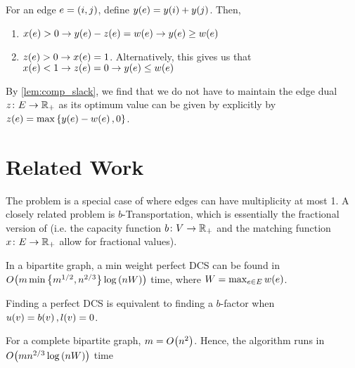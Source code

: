 
\begin{lemma}
    For an edge $e = \lrp{i, j}$, define $\f[y]{e} = \f[y]{i} + \f[y]{j}$. Then, 
    \begin{enumerate}
        \item $\f[x]{e} > 0 \rightarrow \f[y]{e} - \f[z]{e} = \f[w]{e} \rightarrow \f[y]{e} \geq \f[w]{e}$
        \item $\f[z]{e} > 0 \rightarrow \f[x]{e} = 1$. Alternatively, this gives us that $\f[x]{e} < 1 \rightarrow \f[z]{e} = 0 \rightarrow \f[y]{e} \leq \f[w]{e}$
    \end{enumerate} 
    \label{lem:comp_slack}
\end{lemma}

By \cref{lem:comp_slack}, we find that we do not have to maintain the edge dual $z \colon E \to \R_+$ as its 
optimum value can be given by explicitly by $\f[z]{e} = \max \lrc{\f[y]{e} - \f[w]{e}, 0}$. 
\begin{comment}
This is, for some $b$-factor $F$, $z$ can de defined as
\begin{equation*}
    \f[z]{e} = 
    \begin{dcases}
        \f[y]{e} - \f[w]{e} &\text{ if }  e \in F\\
        0 &\text{ otherwise }  .
    \end{dcases}
\end{equation*}
\end{comment}

\section{Related Work}

The \minbfactor{} problem is a special case of \minpbmatch{} where edges can have multiplicity at most 1. A closely related problem 
is $b$-\textsf{Transportation}, which is essentially the fractional version of \minpbmatch{} 
(i.e.\! the capacity function $b \colon V \to \R_+$ and the matching function $x \colon E \to \R_+$ allow for fractional values).

\begin{desclist}
    \item In a bipartite graph, a min weight perfect DCS can be found in $\bigO{m \min \lrc{m^{1/2}, n^{2/3}} \log \lrp{nW}}$ time, where $W = \max_{e \in E} \f[w]{e}$. 
    \item Finding a perfect DCS is equivalent to finding a $b$-factor when $\f[u]{v} = \f[b]{v}, \f[l]{v} = 0$.
    \item For a complete bipartite graph, $m = \bigO{n^2}$. Hence, the algorithm runs in $\bigO{mn^{2/3}\log \lrp{nW}}$ time 
\end{desclist}

